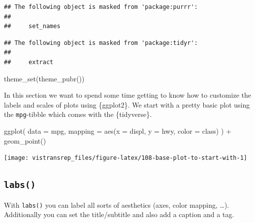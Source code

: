 \documentclass[]{book}
\newenvironment{Shaded}{}{}
\newcommand{\DataTypeTok}[1]{#1}
\newcommand{\KeywordTok}[1]{\textcolor[rgb]{0.00,0.00,1.00}{#1}}
\newcommand{\NormalTok}[1]{#1}
\newcommand{\OperatorTok}[1]{#1}
\newcommand{\StringTok}[1]{\textcolor[rgb]{0.00,0.50,0.50}{#1}}
\begin{document}
\begin{verbatim}
## The following object is masked from 'package:purrr':
## 
##     set_names
\end{verbatim}

\begin{verbatim}
## The following object is masked from 'package:tidyr':
## 
##     extract
\end{verbatim}

\begin{Shaded}
\begin{Highlighting}[]
\KeywordTok{theme_set}\NormalTok{(}\KeywordTok{theme_pubr}\NormalTok{())}
\end{Highlighting}
\end{Shaded}

In this section we want to spend some time getting to know how to customize the labels and scales of plots using \{ggplot2\}.
We start with a pretty basic plot using the \texttt{mpg}-tibble which comes with the \{tidyverse\}.

\begin{Shaded}
\begin{Highlighting}[]
\KeywordTok{ggplot}\NormalTok{(}
  \DataTypeTok{data =}\NormalTok{ mpg,}
  \DataTypeTok{mapping =} \KeywordTok{aes}\NormalTok{(}\DataTypeTok{x =}\NormalTok{ displ, }\DataTypeTok{y =}\NormalTok{ hwy, }\DataTypeTok{color =}\NormalTok{ class)}
\NormalTok{) }\OperatorTok{+}
\StringTok{  }\KeywordTok{geom_point}\NormalTok{()}
\end{Highlighting}
\end{Shaded}

\begin{flushright}\texttt{[image: vistransrep\_files/figure-latex/108-base-plot-to-start-with-1]} \end{flushright}

\hypertarget{labs}{%
\subsection{\texorpdfstring{\texttt{labs()}}{labs()}}\label{labs}}

With \texttt{labs()} you can label all sorts of aesthetics (axes, color mapping, \ldots{}).
Additionally you can set the title/subtitle and also add a caption and a tag.
\end{document}
